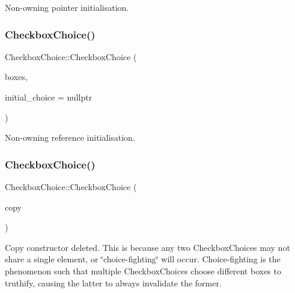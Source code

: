 Non-\/owning pointer initialisation. \mbox{\label{class_checkbox_choice_acbbc8db19fa53fc73c913780e0fb2b89}} 
\subsubsection{\texorpdfstring{Checkbox\+Choice()}{CheckboxChoice()}\hspace{0.1cm}{\footnotesize\ttfamily [2/4]}}
{\footnotesize\ttfamily Checkbox\+Choice\+::\+Checkbox\+Choice (\begin{DoxyParamCaption}\item[{std\+::initializer\+\_\+list$<$ std\+::reference\+\_\+wrapper$<$ \mbox{\hyperlink{class_checkbox}{Checkbox}} $>$$>$}]{boxes,  }\item[{\mbox{\hyperlink{class_checkbox}{Checkbox}} $\ast$}]{initial\+\_\+choice = {\ttfamily nullptr} }\end{DoxyParamCaption})}

Non-\/owning reference initialisation. \mbox{\label{class_checkbox_choice_a1434699c2e3295b5037010403cbab6c9}} 
\subsubsection{\texorpdfstring{Checkbox\+Choice()}{CheckboxChoice()}\hspace{0.1cm}{\footnotesize\ttfamily [3/4]}}
{\footnotesize\ttfamily Checkbox\+Choice\+::\+Checkbox\+Choice (\begin{DoxyParamCaption}\item[{const \mbox{\hyperlink{class_checkbox_choice}{Checkbox\+Choice}} \&}]{copy }\end{DoxyParamCaption})\hspace{0.3cm}{\ttfamily [delete]}}

Copy constructor deleted. This is because any two Checkbox\+Choices may not share a single element, or \char`\"{}choice-\/fighting\char`\"{} will occur. Choice-\/fighting is the phenomenon such that multiple Checkbox\+Choices choose different boxes to truthify, causing the latter to always invalidate the former. \mbox{\label{class_checkbox_choice_a907edd806c8e5a7ef45fdc64c013f4eb}} 
